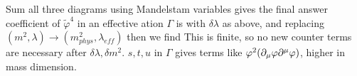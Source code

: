 \documentclass{article}
\begin{document}
Sum all three diagrams using Mandelstam variables 
gives the final answer 
coefficient of $\tilde{\varphi}^4$ in an effective ation $\Gamma$ is 
with $\delta \lambda$ as above, and replacing $(m^2, \lambda) \to (m_{phys}^2, \lambda_{eff})$ then we find 
This is finite, so no new counter terms are necessary after $\delta \lambda, \delta m^2$. $s,t,u$ in $\Gamma$ gives terms like $\varphi^2(\partial_\mu \varphi \partial^\mu \varphi)$, higher in mass dimension. 
\end{document}
